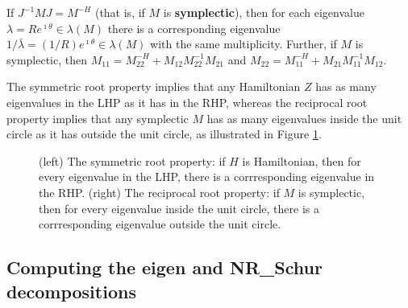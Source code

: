 \begin{fact} \label{fact.A.D.D.Ed}
If $J^{-1} M J = M^{-H}$ (that is, if $M$ is {\bf symplectic}), then for each eigenvalue $\lambda=R e^{\imath \theta}  \in \lambda(M)$
there is a corresponding eigenvalue $1/\bar\lambda = (1/R) e^{\imath \theta} \in \lambda(M)$
with the same multiplicity.  Further, if $M$ is symplectic, then $M_{11}=M_{22}^{-H}+M_{12} M_{22}^{-1} M_{21}$ and $M_{22}=M_{11}^{-H}+M_{21} M_{11}^{-1} M_{12}$.
\end{fact}

The symmetric root property implies that any Hamiltonian $Z$ has as many eigenvalues in the LHP as it has in the RHP, whereas
the reciprocal root property implies that any symplectic $M$ has as many eigenvalues inside the unit circle as it has outside the unit circle, as illustrated in Figure \ref{fig:symroot}.
\clearpage

\begin{figure}[h!]
\centerline{\qquad \qquad {}}
\caption{(left) The symmetric root property: if $H$ is Hamiltonian, then for every eigenvalue in the LHP, there is a
corrresponding eigenvalue in the RHP.
(right) The reciprocal root property: if $M$ is symplectic, then for every eigenvalue inside the unit circle, there is a
corrresponding eigenvalue outside the unit circle.}\label{fig:symroot}
\end{figure}

\subsection{Computing the eigen and NR_Schur decompositions}\label{sec.A.D.E}

 \label{sec.A.D.E.A}

